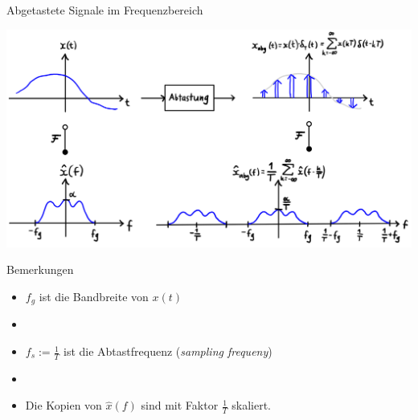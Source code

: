 \documentclass[14pt, aspectratio=169, handout]{beamer}
\begin{document}
\begin{frame}{Abgetastete Signale im Frequenzbereich}
    \begin{center}
        \includegraphics[width=0.92\linewidth]{figures/abtastung2.jpg}
    \end{center}
\end{frame}

\begin{frame}{Bemerkungen}
    \vspace*{12pt}
    \begin{itemize}
        \item $f_g$ ist die Bandbreite von $x(t)$
        \item[] 
        \item $f_s := \displaystyle\frac{1}{T}$ ist die Abtastfrequenz (\textit{sampling frequeny})
        \item[] 
        \item Die Kopien von $\hat{x}(f)$ sind mit Faktor $\frac{1}{T}$ skaliert.
    \end{itemize}
\end{frame}
\end{document}
